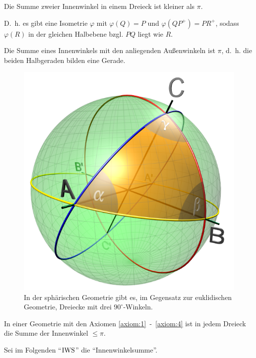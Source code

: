\begin{folgerung}\label{folgerung:14.10}%
    Die Summe zweier Innenwinkel in einem Dreieck ist kleiner als $\pi$.
\end{folgerung}

D.~h. es gibt eine Isometrie $\varphi$ mit $\varphi(Q) = P$
und $\varphi(QP^+) = PR^+$, sodass $\varphi(R)$ in der gleichen
Halbebene bzgl. $PQ$ liegt wie $R$.

\begin{beweis}
    Die Summe eines Innenwinkels mit den anliegenden Außenwinkeln ist
    $\pi$, d.~h. die beiden Halbgeraden bilden eine Gerade.
\end{beweis}

\begin{figure}[htp]
    \centering
    \includegraphics[width=0.4\linewidth, keepaspectratio]{figures/Spherical_triangle_3d_opti.png}
    \caption{In der sphärischen Geometrie gibt es, im Gegensatz zur euklidischen Geometrie, Dreiecke mit drei $90^\circ$-Winkeln.}
    \label{fig:spherical-triangle}
\end{figure}

\begin{proposition}\label{prop:14.11}%
    In einer Geometrie mit den Axiomen \ref{axiom:1}~-~\ref{axiom:4}
    ist in jedem Dreieck die Summe der Innenwinkel $\leq \pi$.
\end{proposition}

Sei im Folgenden \enquote{$\operatorname{IWS}$} die \enquote{Innenwinkelsumme}.

